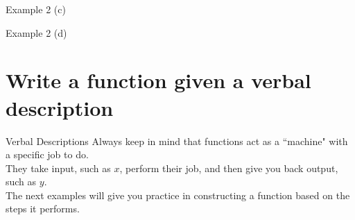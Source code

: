 \documentclass[t,usenames,dvipsnames]{beamer}
\begin{document}
\begin{frame}{Example 2}
(c) \newline\\  
\begin{minipage}{0.5\textwidth}
\end{minipage} 
\hspace{0.45cm}
\begin{minipage}{0.4\textwidth}
\end{minipage}
\end{frame}

\begin{frame}{Example 2}
(d) \newline\\  
\begin{minipage}{0.5\textwidth}
\end{minipage} 
\hspace{0.45cm}
\begin{minipage}{0.4\textwidth}
\end{minipage}
\end{frame}

\section{Write a function given a verbal description}

\begin{frame}{Verbal Descriptions}
Always keep in mind that functions act as a ``machine" with a specific job to do. \newline\\

They take input, such as $x$, perform their job, and then give you back output, such as $y$. \newline\\

The next examples will give you practice in constructing a function based on the steps it performs.
\end{frame}
\end{document}
